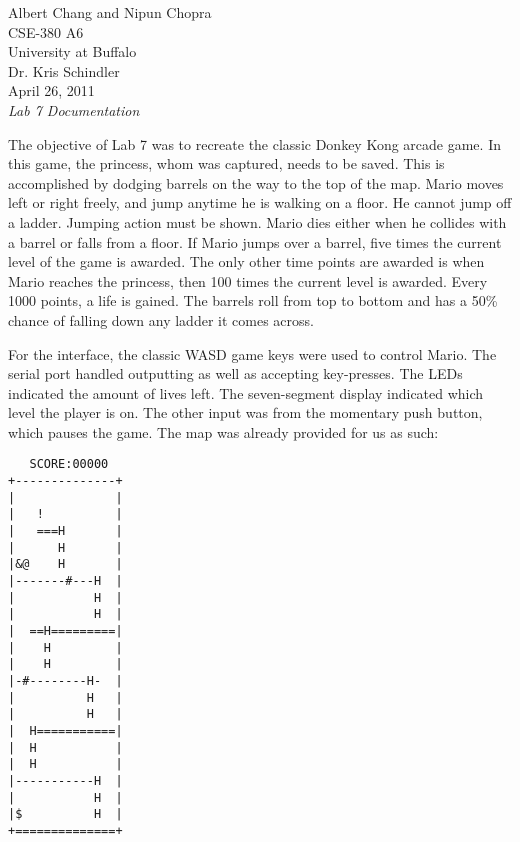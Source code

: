 \documentclass[letterpaper,10pt]{article}
\begin{document}
    Albert Chang and Nipun Chopra\\
    CSE-380 A6\\
    University at Buffalo\\
    Dr. Kris Schindler\\
    April 26, 2011\\
    \textit{Lab 7 Documentation}

    The objective of Lab 7 was to recreate the classic Donkey Kong arcade game.
    In this game, the princess, whom was captured, needs to be saved. This is
    accomplished by dodging barrels on the way to the top of the map. Mario moves
    left or right freely, and jump anytime he is walking on a floor. He cannot
    jump off a ladder. Jumping action must be shown. Mario dies either when he
    collides with a barrel or falls from a floor. If Mario jumps over a barrel,
    five times the current level of the game is awarded. The only other time
    points are awarded is when Mario reaches the princess, then 100 times the
    current level is awarded. Every 1000 points, a life is gained. The barrels
    roll from top to bottom and has a 50\% chance of falling down any ladder it
    comes across.

    For the interface, the classic WASD game keys were used to control Mario.
    The serial port handled outputting as well as accepting key-presses. The
    LEDs indicated the amount of lives left. The seven-segment display
    indicated which level the player is on. The other input was from the
    momentary push button, which pauses the game. The map was already provided
    for us as such:

    \begin{center}
        \begin{minipage}{30mm}
\begin{verbatim}
   SCORE:00000  
+--------------+
|              |
|   !          |
|   ===H       |
|      H       |
|&@    H       |
|-------#---H  |
|           H  |
|           H  |
|  ==H=========|
|    H         |
|    H         |
|-#--------H-  |
|          H   |
|          H   |
|  H===========|
|  H           |
|  H           |
|-----------H  |
|           H  |
|$          H  |
+==============+
\end{verbatim}
        \end{minipage}
    \end{center}
\end{document}
